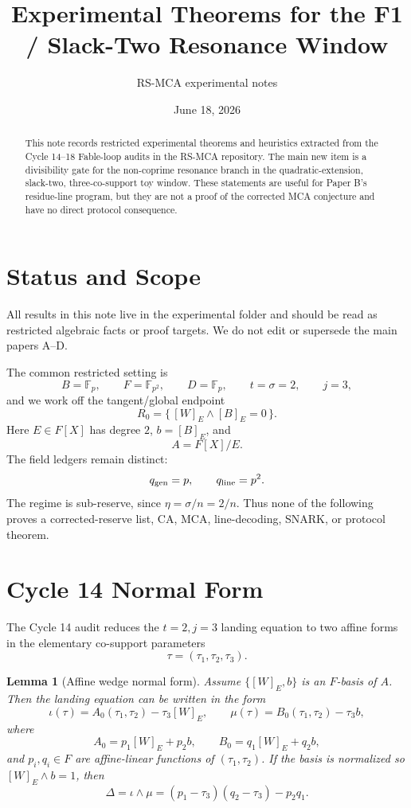 \documentclass[11pt]{article}
\title{Experimental Theorems for the F1 / Slack-Two Resonance Window}
\author{RS-MCA experimental notes}
\date{June 18, 2026}
\newtheorem{lemma}{Lemma}
\newcommand{\F}{\mathbb F}
\newcommand{\tauone}{\tau_1}
\newcommand{\tautwo}{\tau_2}
\newcommand{\tauthree}{\tau_3}
\newcommand{\qline}{q_{\rm line}}
\newcommand{\qgen}{q_{\rm gen}}
\begin{document}
\maketitle

\begin{abstract}
This note records restricted experimental theorems and heuristics extracted
from the Cycle 14--18 Fable-loop audits in the RS-MCA repository.  The main
new item is a divisibility gate for the non-coprime resonance branch in the
quadratic-extension, slack-two, three-co-support toy window.  These statements
are useful for Paper B's residue-line program, but they are not a proof of the
corrected MCA conjecture and have no direct protocol consequence.
\end{abstract}

\section{Status and Scope}

All results in this note live in the experimental folder and should be read as
restricted algebraic facts or proof targets.  We do not edit or supersede the
main papers A--D.

The common restricted setting is
\[
  B=\F_p,\qquad F=\F_{p^2},\qquad D=\F_p,\qquad
  t=\sigma=2,\qquad j=3,
\]
and we work off the tangent/global endpoint
\[
  R_0=\{\, [W]_E\wedge [B]_E=0\,\}.
\]
Here \(E\in F[X]\) has degree \(2\), \(b=[B]_E\), and
\[
  A=F[X]/E.
\]
The field ledgers remain distinct:
\[
  \qgen=p,\qquad \qline=p^2.
\]
The regime is sub-reserve, since \(\eta=\sigma/n=2/n\).  Thus none of the
following proves a corrected-reserve list, CA, MCA, line-decoding, SNARK, or
protocol theorem.

\section{Cycle 14 Normal Form}

The Cycle 14 audit reduces the \(t=2,j=3\) landing equation to two affine
forms in the elementary co-support parameters
\[
  \tau=(\tauone,\tautwo,\tauthree).
\]

\begin{lemma}[Affine wedge normal form]
\label{lem:affine-wedge}
Assume \(\{[W]_E,b\}\) is an \(F\)-basis of \(A\).  Then the landing equation
can be written in the form
\[
  \iota(\tau)=A_0(\tauone,\tautwo)-\tauthree [W]_E,\qquad
  \mu(\tau)=B_0(\tauone,\tautwo)-\tauthree b,
\]
where
\[
  A_0=p_1[W]_E+p_2 b,\qquad B_0=q_1[W]_E+q_2 b,
\]
and \(p_i,q_i\in F\) are affine-linear functions of
\((\tauone,\tautwo)\).  If the basis is normalized so
\([W]_E\wedge b=1\), then
\[
  \Delta=\iota\wedge\mu
    =(p_1-\tauthree)(q_2-\tauthree)-p_2q_1.
\]
\end{lemma}
\end{document}
